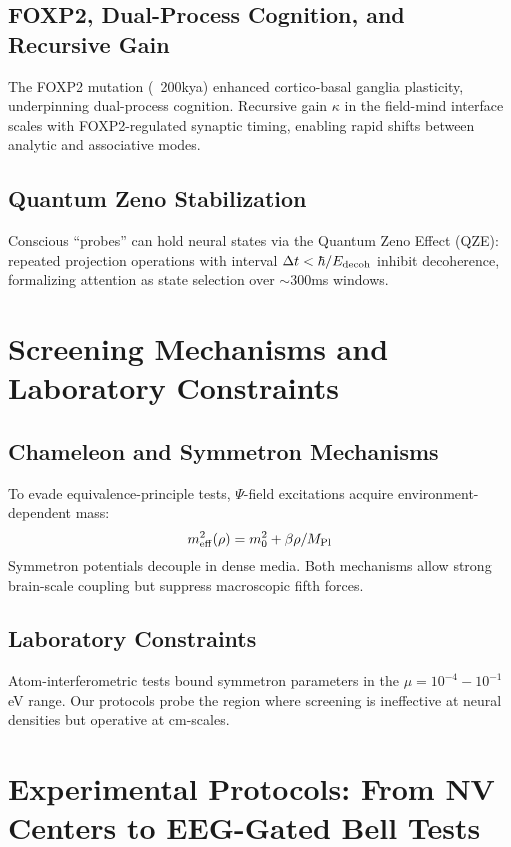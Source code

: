 \documentclass[aps,prx,twocolumn,nofootinbib,superscriptaddress,longbibliography]{revtex4-2}
\begin{document}
\subsection{FOXP2, Dual-Process Cognition, and Recursive Gain}
The FOXP2 mutation (~200kya) enhanced cortico-basal ganglia plasticity, underpinning dual-process cognition. Recursive gain $\kappa$ in the field-mind interface scales with FOXP2-regulated synaptic timing, enabling rapid shifts between analytic and associative modes.

\subsection{Quantum Zeno Stabilization}
Conscious ``probes'' can hold neural states via the Quantum Zeno Effect (QZE): repeated projection operations with interval $\Delta t < \hbar/E_{\rm decoh}$ inhibit decoherence, formalizing attention as state selection over $\sim$300ms windows.

\section{Screening Mechanisms and Laboratory Constraints}

\subsection{Chameleon and Symmetron Mechanisms}
To evade equivalence-principle tests, $\Psi$-field excitations acquire environment-dependent mass:
\begin{equation}
    m_{\rm eff}^2(\rho) = m_0^2 + \beta\rho/M_{\rm Pl}
\end{equation}
Symmetron potentials decouple in dense media. Both mechanisms allow strong brain-scale coupling but suppress macroscopic fifth forces.

\subsection{Laboratory Constraints}
Atom-interferometric tests bound symmetron parameters in the $\mu = 10^{-4} - 10^{-1}$ eV range. Our protocols probe the region where screening is ineffective at neural densities but operative at cm-scales.

\section{Experimental Protocols: From NV Centers to EEG-Gated Bell Tests}
\end{document}
